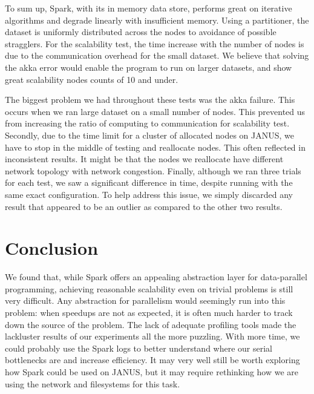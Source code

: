 \documentclass{article}
\begin{document}
To sum up, Spark, with its in memory data store, performs great on iterative
algorithms and degrade linearly with insufficient memory. Using a partitioner,
the dataset is uniformly distributed across the nodes to avoidance of possible
stragglers. For the scalability test, the time increase with the number of nodes
is due to the communication overhead for the small dataset. We believe that
solving the akka error would enable the program to run on larger datasets, and
show great scalability nodes counts of 10 and under. 

The biggest problem we had throughout these tests was the akka failure. This
occurs when we ran large dataset on a small number of nodes. This prevented us
from increasing the ratio of computing to communication for scalability test.
Secondly, due to the time limit for a cluster of allocated nodes on JANUS, we
have to stop in the middle of testing and reallocate nodes. This often
reflected in inconsistent results. It might be that the nodes we reallocate
have different network topology with network congestion. Finally, although we
ran three trials for each test, we saw a significant difference in time,
despite running with the same exact configuration. To help address this issue,
we simply discarded any result that appeared to be an outlier as compared to
the other two results.




\section{Conclusion}
We found that, while Spark offers an appealing abstraction layer for
data-parallel programming, achieving reasonable scalability even on trivial
problems is still very difficult. Any abstraction for parallelism would
seemingly run into this problem: when speedups are not as expected, it is often
much harder to track down the source of the problem.  The lack of adequate
profiling tools made the lackluster results of our experiments all the more
puzzling. With more time, we could probably use the Spark logs to better
understand where our serial bottlenecks are and increase efficiency. It may
very well still be worth exploring how Spark could be used on JANUS, but it may
require rethinking how we are using the network and filesystems for this task.



\end{document}
